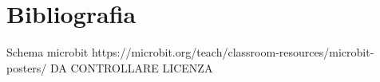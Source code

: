 \documentclass[a4paper, 12pt]{article}
\begin{document}
\pagestyle{empty}
    
	\newpage
	\tableofcontents
	\newpage
	\pagestyle{fancy}
    \newpage
	
	\newpage
	
	\newpage
	
	\newpage
	\section{Bibliografia}
	Schema microbit https://microbit.org/teach/classroom-resources/microbit-posters/ DA CONTROLLARE LICENZA
    \printbibliography[heading=bibintoc]
\end{document}
